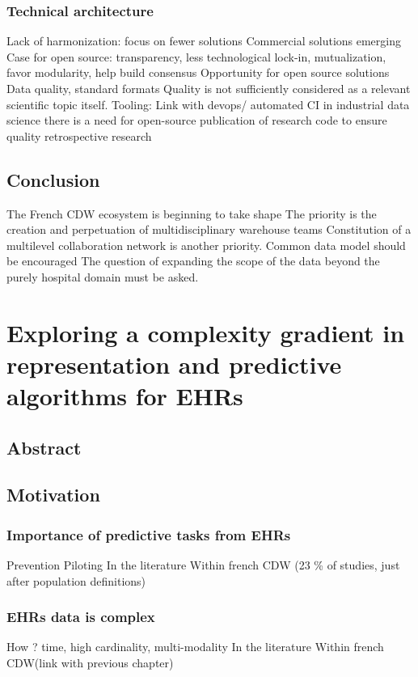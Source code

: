 \documentclass{report}
\begin{document}
\subsection{Technical architecture}
Lack of harmonization: focus on fewer solutions
Commercial solutions emerging
Case for open source: transparency, less technological lock-in, mutualization, favor modularity, help build consensus
Opportunity for open source solutions
Data quality, standard formats
Quality is not sufficiently considered as a relevant scientific topic itself.
Tooling: Link with devops/ automated CI in industrial data science
there is a need for open-source publication of research code to ensure quality retrospective research

\section{Conclusion}
The French CDW ecosystem is beginning to take shape
The priority is the creation and perpetuation of multidisciplinary warehouse teams
Constitution of a multilevel collaboration network is another priority.
Common data model should be encouraged
The question of expanding the scope of the data beyond the purely hospital domain must be asked.


\chapter{Exploring a complexity gradient in representation and predictive algorithms for EHRs}\label{chapter:predictive_models}
\section{Abstract}\label{sec:predictive_models:abstract}

\section{Motivation}\label{sec:predictive_models:motivation}

\subsection{Importance of predictive tasks from EHRs}\label{subsec:predictive_models:importance}
Prevention
Piloting
In the literature
Within french CDW (23 \% of studies, just after population definitions)

\subsection{EHRs data is complex}\label{subsec:predictive_models:complex_data}
How ? time, high cardinality, multi-modality
In the literature
Within french CDW(link with previous chapter)
\end{document}
